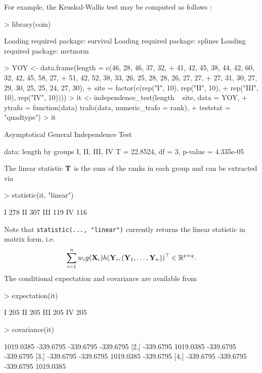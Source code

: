 \documentclass[letter]{article}
\begin{document}
For example, the Kruskal-Wallis test may be computed as follows
\citep[example taken from][Table 6.3, page 200]{HollanderWolfe1999}:

\begin{Schunk}
\begin{Sinput}
> library(coin)
\end{Sinput}
\begin{Soutput}
Loading required package: survival 
Loading required package: splines 
Loading required package: mvtnorm 
\end{Soutput}
\begin{Sinput}
> YOY <- data.frame(length = c(46, 28, 46, 37, 32, 
+     41, 42, 45, 38, 44, 42, 60, 32, 42, 45, 58, 27, 
+     51, 42, 52, 38, 33, 26, 25, 28, 28, 26, 27, 27, 
+     27, 31, 30, 27, 29, 30, 25, 25, 24, 27, 30), 
+     site = factor(c(rep("I", 10), rep("II", 10), 
+         rep("III", 10), rep("IV", 10))))
> it <- independence_test(length ~ site, data = YOY, 
+     ytrafo = function(data) trafo(data, numeric_trafo = rank), 
+     teststat = "quadtype")
> it
\end{Sinput}
\begin{Soutput}
	Asymptotical General Independence Test

data:  length by groups I, II, III, IV 
T = 22.8524, df = 3, p-value = 4.335e-05
\end{Soutput}
\end{Schunk}
The linear statistic $\mathbf{T}$ is the sum of the ranks in each group and 
can be extracted via
\begin{Schunk}
\begin{Sinput}
> statistic(it, "linear")
\end{Sinput}
\begin{Soutput}
    [,1]
I    278
II   307
III  119
IV   116
\end{Soutput}
\end{Schunk}
Note that \texttt{statistic(..., "linear")} currently returns the linear
statistic in matrix form, i.e.
\begin{eqnarray*}
\sum_{i = 1}^n w_i g(\mathbf{X}_i) h(\mathbf{Y}_i, (\mathbf{Y}_1, \dots, \mathbf{Y}_n))^\top \in \mathbb{R}^{p
\times q}.
\end{eqnarray*}
The conditional expectation and covariance are available from
\begin{Schunk}
\begin{Sinput}
> expectation(it)
\end{Sinput}
\begin{Soutput}
    [,1]
I    205
II   205
III  205
IV   205
\end{Soutput}
\begin{Sinput}
> covariance(it)
\end{Sinput}
\begin{Soutput}
          [,1]      [,2]      [,3]      [,4]
[1,] 1019.0385 -339.6795 -339.6795 -339.6795
[2,] -339.6795 1019.0385 -339.6795 -339.6795
[3,] -339.6795 -339.6795 1019.0385 -339.6795
[4,] -339.6795 -339.6795 -339.6795 1019.0385
\end{Soutput}
\end{Schunk}
\end{document}
